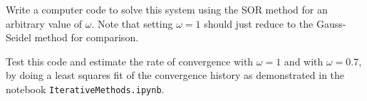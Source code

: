 \documentclass[10pt]{article}
\begin{document}
Write a computer code to solve this system using the SOR method for an
arbitrary value of $\omega$.  Note that setting $\omega = 1$ should just
reduce to the Gauss-Seidel method for comparison.  

Test this code and estimate the rate of convergence with $\omega = 1$ and
with $\omega = 0.7$, by doing a least squares fit of the convergence
history as demonstrated in the notebook {\tt IterativeMethods.ipynb}.





\end{document}
